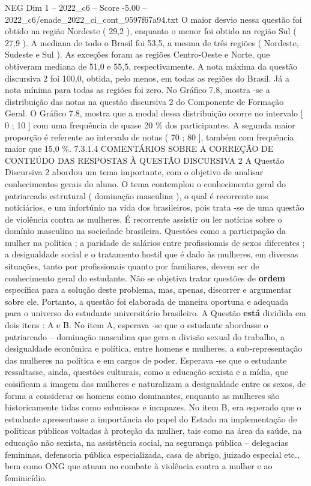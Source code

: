 \begin{textsample}{NEG Dim 1 – 2022\_c6 – Score -5.00 – 2022\_c6/enade\_2022\_ci\_cont\_9597f67a94.txt}
O maior desvio nessa questão foi obtido na região Nordeste ( 29,2 ), enquanto o menor foi obtido na região Sul ( 27,9 ).
A mediana de todo o Brasil foi 53,5, a mesma de três regiões ( Nordeste, Sudeste e Sul ).
As exceções foram as regiões Centro-Oeste e Norte, que obtiveram mediana de 51,0 e 55,5, respectivamente.
A nota máxima da questão discursiva 2 foi 100,0, obtida, pelo menos, em todas as regiões do Brasil.
Já a nota mínima para todas as regiões foi zero.
No Gráfico 7.8, mostra -se a distribuição das notas na questão discursiva 2 do Componente de Formação Geral.
O Gráfico 7.8, mostra que a modal dessa distribuição ocorre no intervalo [ 0 ; 10 ] com uma frequência de quase 20 \% dos participantes.
A segunda maior proporção é referente ao intervalo de notas ( 70 ; 80 ], também com frequência maior que 15,0 \%. 7.3.1.4 COMENTÁRIOS SOBRE A CORREÇÃO DE CONTEÚDO DAS RESPOSTAS À QUESTÃO DISCURSIVA 2 A Questão Discursiva 2 abordou um tema importante, com o objetivo de analisar conhecimentos gerais do aluno.
O tema contemplou o conhecimento geral do patriarcado estrutural ( dominação masculina ), o qual é recorrente nos noticiários, e um infortúnio na vida dos brasileiros, pois trata -se de uma questão de violência contra as mulheres.
É recorrente assistir ou ler notícias sobre o domínio masculino na sociedade brasileira.
Questões como a participação da mulher na política ; a paridade de salários entre profissionais de sexos diferentes ; a desigualdade social e o tratamento hostil que é dado às mulheres, em diversas situações, tanto por profissionais quanto por familiares, devem ser de conhecimento geral do estudante.
Não se objetiva tratar questões de \textbf{ordem} específica para a solução deste problema, mas, apenas, discorrer e argumentar sobre ele.
Portanto, a questão foi elaborada de maneira oportuna e adequada para o universo do estudante universitário brasileiro.
A Questão \textbf{está} dividida em dois itens : A e B.
No item A, esperava -se que o estudante abordasse o patriarcado – dominação masculina que gera a divisão sexual do trabalho, a desigualdade econômica e política, entre homens e mulheres, a sub-representação das mulheres na política e em cargos de poder.
Esperava -se que o estudante ressaltasse, ainda, questões culturais, como a educação sexista e a mídia, que coisificam a imagem das mulheres e naturalizam a desigualdade entre os sexos, de forma a considerar os homens como dominantes, enquanto as mulheres são historicamente tidas como submissas e incapazes.
No item B, era esperado que o estudante apresentasse a importância do papel do Estado na implementação de políticas públicas voltadas à proteção da mulher, tais como na área da saúde, na educação não sexista, na assistência social, na segurança pública – delegacias femininas, defensoria pública especializada, casa de abrigo, juizado especial etc., bem como ONG que atuam no combate à violência contra a mulher e ao feminicídio.

\end{textsample}
